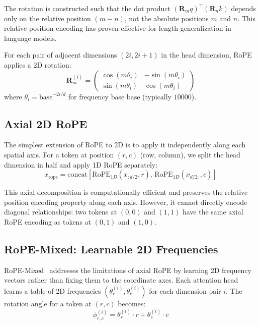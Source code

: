\documentclass{article}
\begin{document}
The rotation is constructed such that the dot product $(\mathbf{R}_m q)^\top (\mathbf{R}_n k)$ depends only on the relative position $(m - n)$, not the absolute positions $m$ and $n$. This relative position encoding has proven effective for length generalization in language models.

For each pair of adjacent dimensions $(2i, 2i+1)$ in the head dimension, RoPE applies a 2D rotation:
\begin{equation}
    \mathbf{R}_m^{(i)} = \begin{pmatrix}
        \cos(m \theta_i) & -\sin(m \theta_i) \\
        \sin(m \theta_i) & \cos(m \theta_i)
    \end{pmatrix}
\end{equation}
where $\theta_i = \text{base}^{-2i/d}$ for frequency base $\text{base}$ (typically $10000$).

\subsection{Axial 2D RoPE}

The simplest extension of RoPE to 2D is to apply it independently along each spatial axis. For a token at position $(r, c)$ (row, column), we split the head dimension in half and apply 1D RoPE separately:
\begin{equation}
    x_{\text{rope}} = \text{concat}\left[\text{RoPE}_{1D}(x_{:d/2}, r),\, \text{RoPE}_{1D}(x_{d/2:}, c)\right]
\end{equation}

This axial decomposition is computationally efficient and preserves the relative position encoding property along each axis. However, it cannot directly encode diagonal relationships: two tokens at $(0, 0)$ and $(1, 1)$ have the same axial RoPE encoding as tokens at $(0, 1)$ and $(1, 0)$.

\subsection{RoPE-Mixed: Learnable 2D Frequencies}

RoPE-Mixed~\cite{heo2024rope} addresses the limitations of axial RoPE by learning 2D frequency vectors rather than fixing them to the coordinate axes. Each attention head learns a table of 2D frequencies $(\theta_r^{(i)}, \theta_c^{(i)})$ for each dimension pair $i$. The rotation angle for a token at $(r, c)$ becomes:
\begin{equation}
    \phi^{(i)}_{r,c} = \theta_r^{(i)} \cdot r + \theta_c^{(i)} \cdot c
\end{equation}
\end{document}
